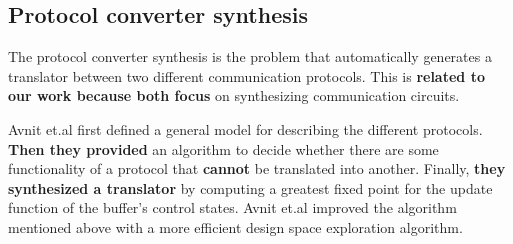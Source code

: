 \documentclass[journal]{IEEEtran}
\begin{document}
{%
%
%
%
%
%
%


\subsection{Protocol converter synthesis}
The protocol converter synthesis is the problem that automatically generates a translator between two different communication protocols.
This is \textbf{related to our work because both focus} on synthesizing communication circuits.

Avnit et.al \cite{converter_date08,converter_todeas09} first defined a general model for describing the different protocols.
\textbf{Then they provided} an algorithm to decide
whether there are some functionality of a protocol that \textbf{cannot} be translated into another.
Finally,
\textbf{they synthesized a translator} by computing a greatest fixed point for the update function of the buffer's control states.
Avnit et.al\cite{converter_date09} improved the algorithm mentioned above with a more efficient design space exploration algorithm.

}
\end{document}
